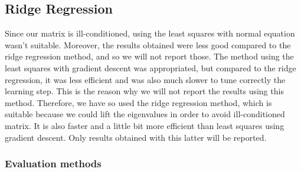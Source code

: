 \documentclass{article} %
\begin{document}
\begin{figure}
\hfill
{} \label{fig:models}
\caption{}
\end{figure}

\subsection{Ridge Regression}

Since our matrix is ill-conditioned, using the least squares with normal equation wasn't suitable. Moreover, the results obtained were less good compared to the ridge regression method, and so we will not report those. The method using the least squares with gradient descent was appropriated, but compared to the ridge regression, it was less efficient and was also much slower to tune correctly the learning step. This is the reason why we will not report the results using this method. Therefore, we have so used the ridge regression method, which is suitable because we could lift the eigenvalues in order to avoid ill-conditioned matrix. It is also faster and a little bit more efficient than least squares using gradient descent. Only results obtained with this latter will be reported.

\subsubsection{Evaluation methods}
\end{document}
